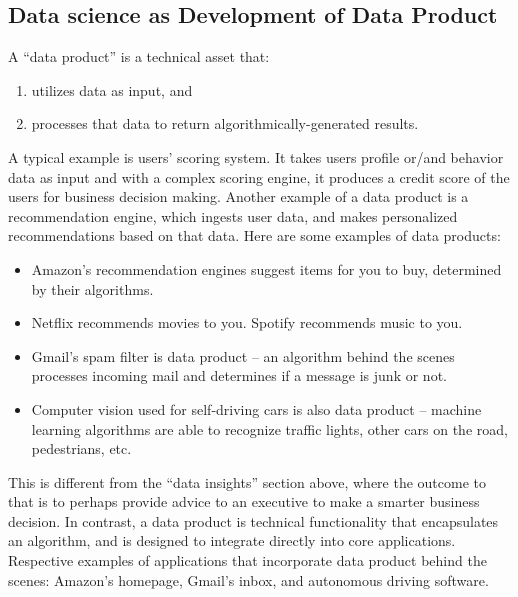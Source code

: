\documentclass[
]{book}
\providecommand{\tightlist}{%
  \setlength{\itemsep}{0pt}\setlength{\parskip}{0pt}}
\begin{document}
\hypertarget{data-science-as-development-of-data-product}{%
\subsection{Data science as Development of Data Product}\label{data-science-as-development-of-data-product}}

A ``data product'' is a technical asset that:

\begin{enumerate}
\def\labelenumi{\arabic{enumi}.}
\tightlist
\item
  utilizes data as input, and
\item
  processes that data to return algorithmically-generated results.
\end{enumerate}

A typical example is users' scoring system. It takes users profile or/and behavior data as input and with a complex scoring engine, it produces a credit score of the users for business decision making.
Another example of a data product is a recommendation engine, which ingests user data, and makes personalized recommendations based on that data.
Here are some examples of data products:

\begin{itemize}
\tightlist
\item
  Amazon's recommendation engines suggest items for you to buy, determined by their algorithms.
\item
  Netflix recommends movies to you. Spotify recommends music to you.
\item
  Gmail's spam filter is data product -- an algorithm behind the scenes processes incoming mail and determines if a message is junk or not.
\item
  Computer vision used for self-driving cars is also data product -- machine learning algorithms are able to recognize traffic lights, other cars on the road, pedestrians, etc.
\end{itemize}

This is different from the ``data insights'' section above, where the outcome to that is to perhaps provide advice to an executive to make a smarter business decision. In contrast, a data product is technical functionality that encapsulates an algorithm, and is designed to integrate directly into core applications. Respective examples of applications that incorporate data product behind the scenes: Amazon's homepage, Gmail's inbox, and autonomous driving software.
\end{document}
